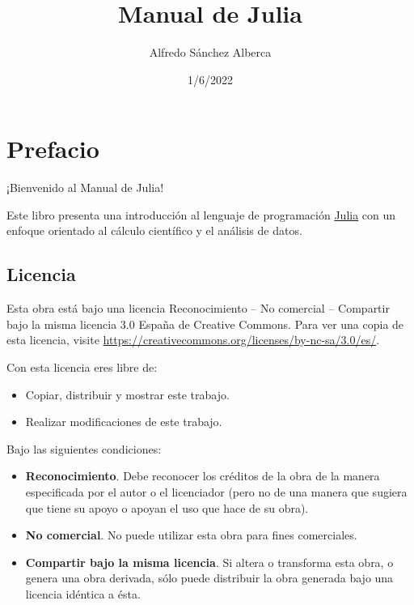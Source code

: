 \documentclass[
  letterpaper,
  DIV=11,
  numbers=noendperiod]{scrreprt}
\title{Manual de Julia}
\author{Alfredo Sánchez Alberca}
\date{1/6/2022}
\providecommand{\tightlist}{%
  \setlength{\itemsep}{0pt}\setlength{\parskip}{0pt}}\usepackage{longtable,booktabs,array}
\renewcommand*\contentsname{Table of contents}
\newcommand\contentsname{Table of contents}
\begin{document}
\maketitle
\ifdefined\Shaded\renewenvironment{Shaded}{\begin{tcolorbox}[borderline west={3pt}{0pt}{shadecolor}, enhanced, breakable, interior hidden, boxrule=0pt, sharp corners, frame hidden]}{\end{tcolorbox}}\fi

\renewcommand*\contentsname{Table of contents}
{
\hypersetup{linkcolor=}
\setcounter{tocdepth}{2}
\tableofcontents
}

\hypertarget{prefacio}{%
\chapter*{Prefacio}\label{prefacio}}

¡Bienvenido al Manual de Julia!

Este libro presenta una introducción al lenguaje de programación
\href{https://julialang.org/}{Julia} con un enfoque orientado al cálculo
científico y el análisis de datos.

\hypertarget{licencia}{%
\section*{Licencia}\label{licencia}}

Esta obra está bajo una licencia Reconocimiento -- No comercial --
Compartir bajo la misma licencia 3.0 España de Creative Commons. Para
ver una copia de esta licencia, visite
\url{https://creativecommons.org/licenses/by-nc-sa/3.0/es/}.

Con esta licencia eres libre de:

\begin{itemize}
\tightlist
\item
  Copiar, distribuir y mostrar este trabajo.
\item
  Realizar modificaciones de este trabajo.
\end{itemize}

Bajo las siguientes condiciones:

\begin{itemize}
\item
  \textbf{Reconocimiento}. Debe reconocer los créditos de la obra de la
  manera especificada por el autor o el licenciador (pero no de una
  manera que sugiera que tiene su apoyo o apoyan el uso que hace de su
  obra).
\item
  \textbf{No comercial}. No puede utilizar esta obra para fines
  comerciales.
\item
  \textbf{Compartir bajo la misma licencia}. Si altera o transforma esta
  obra, o genera una obra derivada, sólo puede distribuir la obra
  generada bajo una licencia idéntica a ésta.
\end{itemize}
\end{document}
